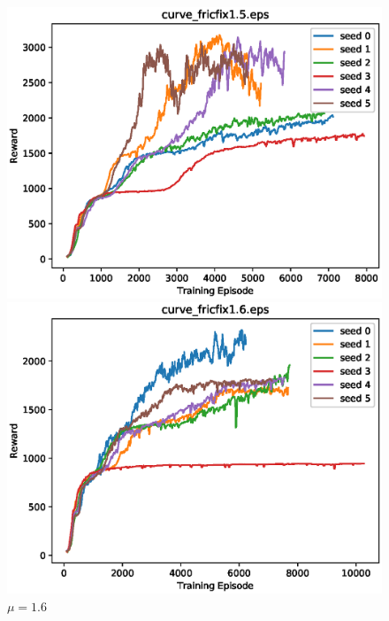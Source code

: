 \begin{figure}[p]
 \begin{minipage}{0.49\hsize}
  \begin{center}
 \includegraphics[width=.99\linewidth]{./fig/curve_fricfix1.5.eps}
  \caption{$\mu=1.5$
  }
  \end{center}
 \end{minipage}
 \begin{minipage}{0.49\hsize}
   \begin{center}
 \includegraphics[width=.99\linewidth]{./fig/curve_fricfix1.6.eps}
  \caption{$\mu=1.6$
     }
  \end{center}
 \end{minipage}
\end{figure}

